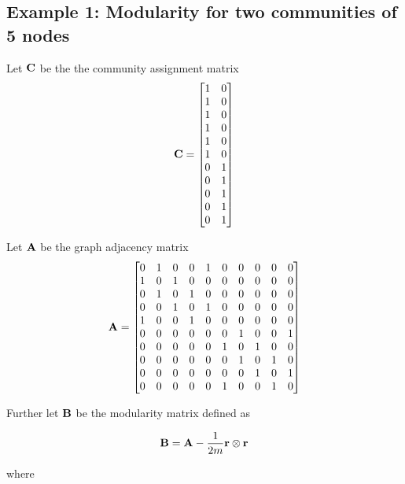 \documentclass[a4paper,12pt]{article}
\begin{document}
	\subsection*{Example 1: Modularity for two communities of 5 nodes}
	Let $\bf{C}$ be the the community assignment matrix 
	\[ {\bf C} = \begin{bmatrix}1 & 0 \\ 1 & 0 \\ 1 & 0 \\ 1 & 0 \\ 1 & 0 \\ 1 & 0 \\ 0 & 1 \\ 0 & 1 \\ 0 & 1 \\ 0 & 1 \\ 0 & 1 \\
	\end{bmatrix}\] 
	
	Let $\bf A$ be the graph adjacency matrix
	\[ {\bf A} = \begin{bmatrix}
		0& 1& 0& 0& 1& 0& 0& 0& 0& 0\\
		1& 0& 1& 0& 0& 0& 0& 0& 0& 0\\
		0& 1& 0& 1& 0& 0& 0& 0& 0& 0\\
		0& 0& 1& 0& 1& 0& 0& 0& 0& 0\\
		1& 0& 0& 1& 0& 0& 0& 0& 0& 0\\
		0& 0& 0& 0& 0& 0& 1& 0& 0& 1\\
		0& 0& 0& 0& 0& 1& 0& 1& 0& 0\\
		0& 0& 0& 0& 0& 0& 1& 0& 1& 0\\
		0& 0& 0& 0& 0& 0& 0& 1& 0& 1\\
		0& 0& 0& 0& 0& 1& 0& 0& 1& 0
	\end{bmatrix}\] 
	
	Further let $\bf B$ be the modularity matrix defined as 
	
	\[ {\bf B} = {\bf A} - \frac{1}{2m}{\bf r}\otimes {\bf r} \]
	
	where 
	
\end{document}
